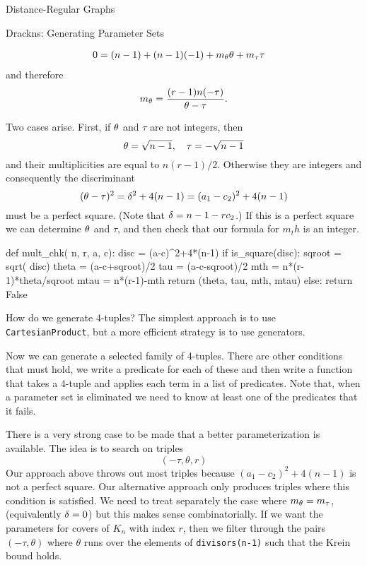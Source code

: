 \begin{chap}{Distance-Regular Graphs}
\begin{sect}{Drackns: Generating Parameter Sets}
\begin{para}
\begin{align*}
    0  &= (n-1) +(n-1)(-1) +m_\theta\theta+m_\tau\tau
\end{align*}
and therefore
\begin{equation}
\label{eq:mult}
    m_\theta = \frac{(r-1)n(-\tau)}{\theta -\tau}.
\end{equation}
\end{para}
%
\begin{para}
Two cases arise. First, if $\theta$ and $\tau$ are not integers, then
\[
    \theta=\sqrt{n-1},\quad \tau=-\sqrt{n-1}
\]
and their multiplicities are equal to $n(r-1)/2$. Otherwise they are integers
and consequently the discriminant
\begin{equation}
\label{eq:discr}
    (\theta-\tau)^2 = \delta^2+4(n-1) = (a_1-c_2)^2+4(n-1)
\end{equation}
must be a perfect square. (Note that $\delta=n-1-rc_2$.) If this is a perfect square
we can determine $\theta$ and $\tau$, and then check that our formula for $m_th$
is an integer.
\end{para}
%
\begin{sageblock}
    def mult_chk( n, r, a, c):
        disc = (a-c)^2+4*(n-1)
        if is_square(disc):
            sqroot = sqrt( disc)
            theta = (a-c+sqroot)/2
            tau = (a-c-sqroot)/2
            mth = n*(r-1)*theta/sqroot
            mtau = n*(r-1)-mth
            return (theta, tau, mth, mtau)
        else:
            return False
\end{sageblock}

\begin{para}
How do we generate 4-tuples? The simplest approach is to use \verb|CartesianProduct|,
but a more efficient strategy is to use generators.
\end{para}
%
\begin{para}
Now we can generate a selected family of 4-tuples. There are other conditions
that must hold, we write a predicate for each of these and then write
a function that takes a 4-tuple and applies each term in a list of
predicates. Note that, when a parameter set is eliminated we need to know
at least one of the predicates that it fails.
\end{para}
%
\begin{para}
There is a very strong case to be made that a better parameterization is available.
The idea is to search on triples
\[
    (-\tau,\theta, r)
\]
Our approach above throws out most triples because $(a_1-c_2)^2+4(n-1)$ is not
a perfect square. Our alternative approach only produces triples where
this condition is satisfied. We need to treat separately the case where
$m_\theta=m_\tau$, (equivalently $\delta=0$) but this makes sense combinatorially. 
If we want the parameters for covers of $K_n$ with index $r$, then we filter
through the pairs $(-\tau, \theta)$ where $\theta$ runs over the elements
of \verb|divisors(n-1)| such that the Krein bound holds.
\end{para}
%
\end{sect}
%
\end{chap}